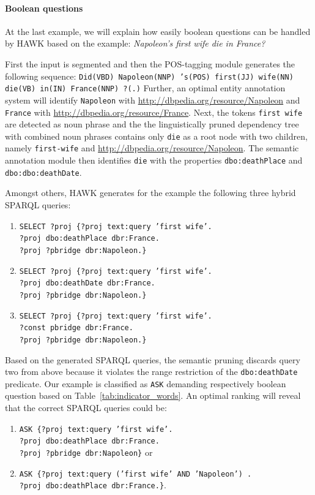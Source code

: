 \paragraph{Boolean questions} At the last example, we will explain how easily boolean questions can be handled by HAWK based on the example: \emph{Napoleon's first wife die in France?}

First the input is segmented and then the POS-tagging module generates the following sequence: \texttt{Did(VBD) Napoleon(NNP) 's(POS) first(JJ) wife(NN) die(VB) in(IN) France(NNP) ?(.)}
Further, an optimal entity annotation system will identify \texttt{Napoleon} with \url{http://dbpedia.org/resource/Napoleon} and \texttt{France} with \url{http://dbpedia.org/resource/France}.
Next, the tokens \texttt{first wife} are detected as noun phrase and the the linguistically pruned dependency tree with combined noun phrases contains only  \texttt{die} as a root node with two children, namely \texttt{first-wife} and \url{http://dbpedia.org/resource/Napoleon}.
The semantic annotation module then identifies \texttt{die} with the properties \texttt{dbo:deathPlace} and \texttt{dbo:dbo:deathDate}.

Amongst others, HAWK generates for the  example the following three hybrid SPARQL queries:
\begin{enumerate}
\item \texttt{SELECT ?proj  \{?proj text:query 'first wife'.\\ ?proj dbo:deathPlace dbr:France.\\ ?proj ?pbridge dbr:Napoleon.\}}
\item \texttt{SELECT ?proj  \{?proj text:query 'first wife'.\\ ?proj dbo:deathDate dbr:France.\\ ?proj ?pbridge dbr:Napoleon.\}}
\item \texttt{SELECT ?proj  \{?proj text:query 'first wife'.\\ ?const pbridge dbr:France.\\ ?proj ?pbridge dbr:Napoleon.\}}
\end{enumerate}


Based on the generated SPARQL queries, the semantic pruning discards query two from above because it violates the range restriction of the \texttt{dbo:deathDate} predicate.
Our  example is classified as \texttt{ASK} demanding respectively boolean question based on Table~\ref{tab:indicator_words}.
An optimal ranking will reveal that the correct SPARQL queries could be:
\begin{enumerate}
\item \texttt{ASK \{?proj text:query 'first wife'. \\?proj dbo:deathPlace dbr:France. \\?proj ?pbridge dbr:Napoleon\}} or 
\item \texttt{ASK \{?proj text:query ('first wife' AND 'Napoleon') .\\ ?proj dbo:deathPlace dbr:France.\}}.
\end{enumerate} 